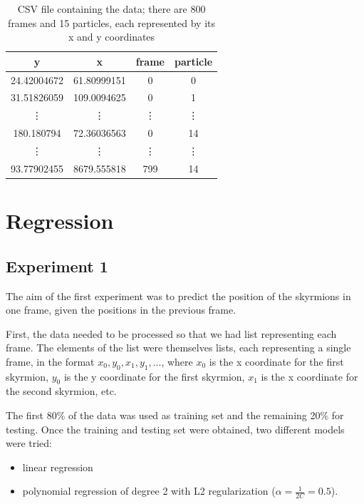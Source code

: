 \documentclass[a4paper]{article}
\begin{document}
  \begin{table}[h!]
    \centering
    \begin{tabular}{|c c c c|} 
     \hline
     y & x & frame & particle\\ [0.5ex] 
     \hline\hline
     24.42004672 & 61.80999151 & 0 & 0 \\ 
     31.51826059 & 109.0094625 & 0 & 1 \\
     \vdots & \vdots & \vdots & \vdots \\
     180.180794 & 72.36036563 & 0 & 14 \\
     \vdots & \vdots & \vdots & \vdots \\
     93.77902455 & 8679.555818 & 799 & 14 \\
     \hline
    \end{tabular}
    \caption{CSV file containing the data; there are 800 frames and 15 particles, each represented by its x and y coordinates}
    \label{table:csv}
  \end{table}

  \section{Regression}

  \subsection{Experiment 1}
  The aim of the first experiment was to predict the position of the skyrmions in one frame, given the positions in the previous frame.

  First, the data needed to be processed so that we had list representing each frame. The elements of the list were themselves lists, each representing a single frame, in the format $x_0, y_0, x_1, y_1, ...$, where $x_0$ is the x coordinate for the first skyrmion, $y_0$ is the y coordinate for the first skyrmion, $x_1$ is the x coordinate for the second skyrmion, etc.

  The first 80\% of the data was used as training set and the remaining 20\% for testing. Once the training and testing set were obtained, two different models were tried:

  \begin{itemize}
    \item linear regression
    \item polynomial regression of degree 2 with L2 regularization ($\alpha=\frac{1}{2C}=0.5$).
  \end{itemize}
\end{document}
